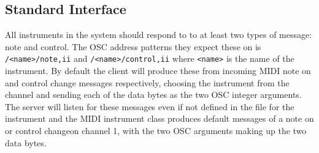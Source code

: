 \documentclass[11pt]{article}
\begin{document}
\subsection{Standard Interface}
All instruments in the system should respond to to at least two types of message: note and control. The OSC address
patterns they expect these on is \texttt{/<name>/note,ii} and \texttt{/<name>/control,ii} where \texttt{<name>} is the name
of the instrument. By default the client will produce these from incoming MIDI note on and control change messages 
respectively, choosing the instrument from the channel and sending each of the data bytes as the two OSC integer 
arguments. The server will listen for these messages even if not defined in the file for the instrument and the MIDI 
instrument class produces default messages of a note on or control changeon channel 1, with the two OSC arguments 
making up the two data bytes.
\end{document}
